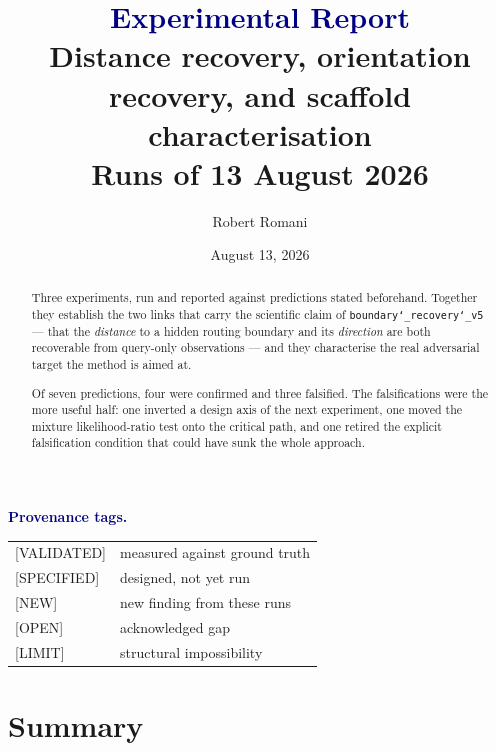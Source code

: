 \documentclass[11pt]{article}
\title{\textcolor{navy}{\sffamily Experimental Report}\\[6pt]
\large\normalfont Distance recovery, orientation recovery, and scaffold characterisation\\
\normalsize\textcolor{muted}{Runs of 13 August 2026}}
\author{Robert Romani}
\date{August 13, 2026}
\newcommand{\provtag}[2]{{\footnotesize\sffamily\textcolor{#1}{[#2]}}}
\newcommand{\VALID}{\provtag{okgreen}{VALIDATED}}
\newcommand{\SPEC}{\provtag{specblue}{SPECIFIED}}
\newcommand{\NEWT}{\provtag{newmag}{NEW}}
\newcommand{\OPENT}{\provtag{openamber}{OPEN}}
\newcommand{\LIMIT}{\provtag{limred}{LIMIT}}
\begin{document}
\maketitle

\begin{abstract}
\noindent Three experiments, run and reported against predictions stated beforehand. Together
they establish the two links that carry the scientific claim of
\texttt{boundary\char`_recovery\char`_v5} --- that the \emph{distance} to a hidden routing boundary
and its \emph{direction} are both recoverable from query-only observations --- and they
characterise the real adversarial target the method is aimed at.

\medskip
\noindent Of seven predictions, four were confirmed and three falsified. The falsifications were
the more useful half: one inverted a design axis of the next experiment, one moved the mixture
likelihood-ratio test onto the critical path, and one retired the explicit falsification
condition that could have sunk the whole approach.
\end{abstract}

\noindent\textbf{\sffamily\small\textcolor{navy}{Provenance tags.}}
\smallskip

{\small
\begin{tabular}{@{}ll@{}}
\VALID & measured against ground truth\\
\SPEC & designed, not yet run\\
\NEWT & new finding from these runs\\
\OPENT & acknowledged gap\\
\LIMIT & structural impossibility\\
\end{tabular}}

\vspace{0.5em}

\section{Summary}
\end{document}
